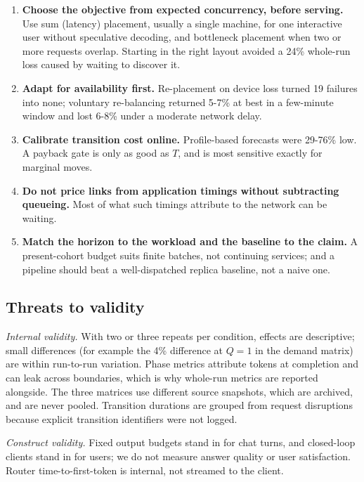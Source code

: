 \documentclass[preprint,12pt]{elsarticle}
\newcommand{\tightlist}{\setlength{\itemsep}{0pt}\setlength{\parskip}{0pt}}
\begin{document}
\begin{enumerate}
\def\labelenumi{\arabic{enumi}.}
\tightlist
\item
  \textbf{Choose the objective from expected concurrency, before
  serving.} Use sum (latency) placement, usually a single machine, for
  one interactive user without speculative decoding, and bottleneck
  placement when two or more requests overlap. Starting in the right
  layout avoided a 24\% whole-run loss caused by waiting to discover it.
\item
  \textbf{Adapt for availability first.} Re-placement on device loss
  turned 19 failures into none; voluntary re-balancing returned 5-7\% at
  best in a few-minute window and lost 6-8\% under a moderate network
  delay.
\item
  \textbf{Calibrate transition cost online.} Profile-based forecasts
  were 29-76\% low. A payback gate is only as good as \(T\), and is most
  sensitive exactly for marginal moves.
\item
  \textbf{Do not price links from application timings without
  subtracting queueing.} Most of what such timings attribute to the
  network can be waiting.
\item
  \textbf{Match the horizon to the workload and the baseline to the
  claim.} A present-cohort budget suits finite batches, not continuing
  services; and a pipeline should beat a well-dispatched replica
  baseline, not a naive one.
\end{enumerate}

\hypertarget{threats-to-validity}{%
\subsection{Threats to validity}\label{threats-to-validity}}

\emph{Internal validity.} With two or three repeats per condition,
effects are descriptive; small differences (for example the 4\%
difference at \(Q=1\) in the demand matrix) are within run-to-run
variation. Phase metrics attribute tokens at completion and can leak
across boundaries, which is why whole-run metrics are reported
alongside. The three matrices use different source snapshots, which are
archived, and are never pooled. Transition durations are grouped from
request disruptions because explicit transition identifiers were not
logged.

\emph{Construct validity.} Fixed output budgets stand in for chat turns,
and closed-loop clients stand in for users; we do not measure answer
quality or user satisfaction. Router time-to-first-token is internal,
not streamed to the client.
\end{document}
